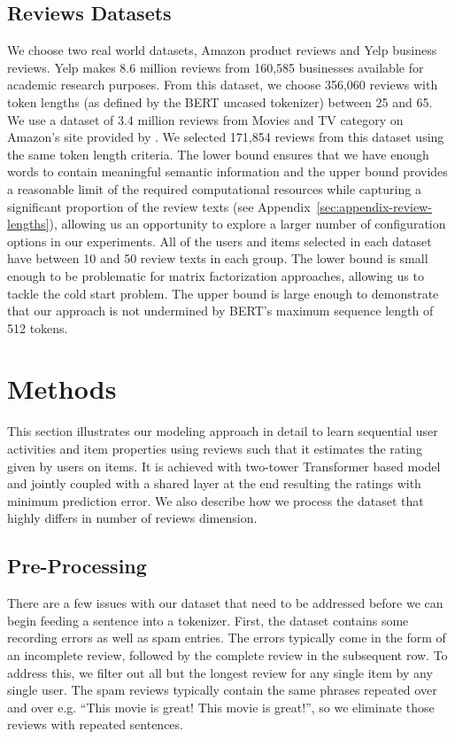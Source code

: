 \documentclass[11pt,a4paper]{article}
\begin{document}
\subsection{Reviews Datasets}
We choose two real world datasets, Amazon product reviews and Yelp business reviews.  Yelp makes 8.6 million reviews from 160,585 businesses available for academic research purposes.  From this dataset, we choose 356,060 reviews with token lengths (as defined by the BERT uncased tokenizer) between 25 and 65.  We use a dataset of 3.4 million reviews from Movies and TV category on Amazon’s site provided by \citet{jianmo-amazon-dataset}.  We selected 171,854 reviews from this dataset using the same token length criteria.  The lower bound ensures that we have enough words to contain meaningful semantic information and the upper bound provides a reasonable limit of the required computational resources while capturing a significant proportion of the review texts (see Appendix~\ref{sec:appendix-review-lengths}), allowing us an opportunity to explore a larger number of configuration options in our experiments.  All of the users and items selected in each dataset have between 10 and 50 review texts in each group.  The lower bound is small enough to be problematic for matrix factorization approaches, allowing us to tackle the cold start problem.  The upper bound is large enough to demonstrate that our approach is not undermined by BERT's maximum sequence length of 512 tokens.

\section{Methods}

This section illustrates our modeling approach in detail to learn sequential user activities and item properties using reviews such that it estimates the rating given by users on items. It is achieved with two-tower Transformer based model and jointly coupled with a shared layer at the end resulting the ratings with minimum prediction error. We also describe how we process the dataset that highly differs in number of reviews dimension.

\subsection{Pre-Processing}
There are a few issues with our dataset that need to be addressed before we can begin feeding a sentence into a tokenizer.  First, the dataset contains some recording errors as well as spam entries.  The errors typically come in the form of an incomplete review, followed by the complete review in the subsequent row. To address this, we filter out all but the longest review for any single item by any single user.  The spam reviews typically contain the same phrases repeated over and over e.g. “This movie is great! This movie is great!”, so we eliminate those reviews with repeated sentences.
\end{document}
